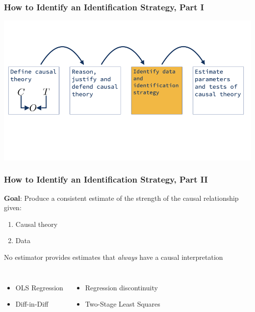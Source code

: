 \documentclass[12pt, block=fill]{beamer}
\begin{document}
\begin{frame}
  \frametitle{How to Identify an Identification Strategy, Part I}
  \centering
  \includegraphics[width = \textwidth]{images/explanatory_workflow/explanatory_workflow_004.png}
\end{frame}

\begin{frame}
  \frametitle{How to Identify an Identification Strategy, Part II} 

  \textbf{Goal}: Produce a consistent estimate of the strength of the
  causal relationship given: 

  \begin{enumerate}
  \item Causal theory 
  \item Data
  \end{enumerate}
  
  No estimator provides estimates that \textit{always} have a causal interpretation

  \begin{columns}
    \begin{itemize}
    \item OLS Regression
    \item Diff-in-Diff
    \end{itemize}

    \begin{itemize}

    \item Regression discontinuity
    \item Two-Stage Least Squares
    \end{itemize}
    
  \end{columns}
  
\end{frame}
\end{document}
